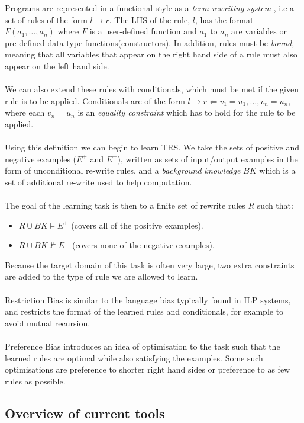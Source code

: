 Programs are represented in a functional style as a \textit{term rewriting system} \cite{Kitzelmann2006}, i.e a set of rules of the form $l \rightarrow r$. The LHS of the rule, $l$, has the format $F(a_1, \dots, a_n)$ where $F$ is a user-defined function and $a_1$ to $a_n$ are variables or pre-defined data type functions(constructors). In addition, rules must be \textit{bound}, meaning that all variables that appear on the right hand side of a rule must also appear on the left hand side.\\ \\
We can also extend these rules with conditionals, which must be met if the given rule is to be applied. Conditionals are of the form $l \rightarrow r \Leftarrow v_1 = u_1, \dots, v_n = u_n$, where each $v_n = u_n$ is an \textit{equality constraint} which has to hold for the rule to be applied. \\ \\
Using this definition we can begin to learn TRS. We take the sets of positive and negative examples ($E^+$ and $E^-$), written as sets of input/output examples in the form of unconditional re-write rules, and a \textit{background knowledge} $BK$ which is a set of additional re-write used to help computation. \\ \\
The goal of the learning task is then to a finite set of rewrite rules $R$ such that:

\begin{itemize}
\item $R \cup BK \models E^+$ (covers all of the positive examples).
\item $R \cup BK \not \models E^-$ (covers none of the negative examples).
\end{itemize}
Because the target domain of this task is often very large, two extra constraints are added to the type of rule we are allowed to learn.\\ \\
Restriction Bias is similar to the language bias typically found in ILP systems, and restricts the format of the learned rules and conditionals, for example to avoid mutual recursion. \\ \\
Preference Bias introduces an idea of optimisation to the task such that the learned rules are optimal while also satisfying the examples. Some such optimisations are preference to shorter right hand sides or preference to as few rules as possible.

\subsection{Overview of current tools}

